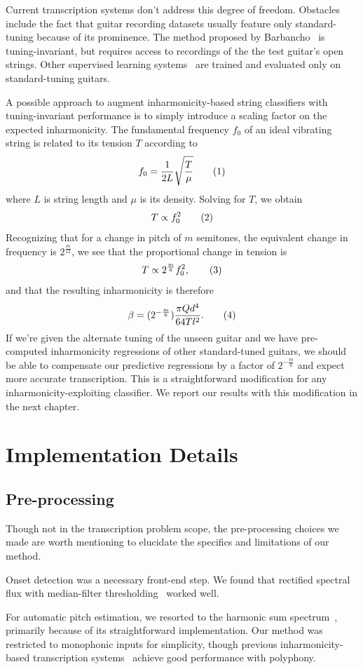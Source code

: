 \documentclass[12pt]{cmuthesis}
\newcommand\addtag{\refstepcounter{equation}\tag{\theequation}}
\begin{document}
Current transcription systems don't address this degree of freedom. Obstacles include the fact that guitar recording datasets usually feature only standard-tuning because of its prominence. The method proposed by Barbancho~\cite{barbanchoi2012} is tuning-invariant, but requires access to recordings of the the test guitar's open strings. Other supervised learning systems~\cite{kehling2014, dittmar2013, abesser2012} are trained and evaluated only on standard-tuning guitars.

A possible approach to augment inharmonicity-based string classifiers with tuning-invariant performance is to simply introduce a scaling factor on the expected inharmonicity. The fundamental frequency $f_0$ of an ideal vibrating string is related to its tension $T$ according to
\[
f_0 = \frac{1}{2L}\sqrt{\frac{T}{\mu}} \addtag
\]
where $L$ is string length and $\mu$ is its density. Solving for $T$, we obtain
\[
T \propto f_0^{2} \addtag
\]
Recognizing that for a change in pitch of $m$ semitones, the equivalent change in frequency is $2^{\frac{m}{12}}$, we see that the proportional change in tension is
\[
T \propto 2^{\frac{m}{6}}f_0^2, \addtag
\]
and that the resulting inharmonicity is therefore
\[
\beta = (2^{-\frac{m}{6}}) \frac{\pi Q d^4}{64 T l^2}. \addtag
\]
If we're given the alternate tuning of the unseen guitar and we have pre-computed inharmonicity regressions of other standard-tuned guitars, we should be able to compensate our predictive regressions by a factor of $2^{-\frac{m}{6}}$ and expect more accurate transcription. This is a straightforward modification for any inharmonicity-exploiting classifier. We report our results with this modification in the next chapter.

\section{Implementation Details}
\subsection{Pre-processing}
Though not in the transcription problem scope, the pre-processing choices we made are worth mentioning to elucidate the specifics and limitations of our method. 

Onset detection was a necessary front-end step. We found that rectified spectral flux with median-filter thresholding~\cite{bello2005,dixon2006} worked well.

For automatic pitch estimation, we resorted to the harmonic sum spectrum~\cite{noll1969}, primarily because of its straightforward implementation. Our method was restricted to monophonic inputs for simplicity, though previous inharmonicity-based transcription systems~\cite{barbanchoi2012,abesser2012,dittmar2013,kehling2014} achieve good performance with polyphony.
\end{document}
